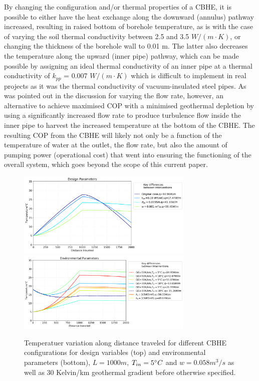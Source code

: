 		By changing the configuration and/or thermal properties of a CBHE, it is possible to either have the heat exchange along the downward (annulus) pathway increased, resulting in raised bottom of borehole temperature, as is with the case of varying the soil thermal conductivity between 2.5 and 3.5 $W/(m \cdot K)$, or changing the thickness of the borehole wall to 0.01 m. The latter also decreases the temperature along the upward (inner pipe) pathway, which can be made possible by assigning an ideal thermal conductivity of an inner pipe at a thermal conductivity of $k_{pp}$ = 0.007 $W/(m \cdot K)$ which is difficult to implement in real projects as it was the thermal conductivity of vacuum-insulated steel pipes. As was pointed out in the discussion for varying the flow rate, however, an alternative to achieve maximised COP with a minimised geothermal depletion by using a significantly increased flow rate to produce turbulence flow inside the inner pipe to harvest the increased temperature at the bottom of the CBHE. The resulting COP from the CBHE will likely not only be a function of the temperature of water at the outlet, the flow rate, but also the amount of pumping power (operational cost) that went into ensuring the functioning of the overall system, which goes beyond the scope of this current paper.
	        \begin{figure}
	            \centering
	            \includegraphics[width=0.75\textwidth]{DesignVars.png}
	            \includegraphics[width=0.75\textwidth]{EnvVars.png}
	            
	            \caption{Temperatuer variation along distance traveled for different CBHE configurations for design variables (top) and environmental parameters (bottom), $L=1000m$, $T_{in}=5\degree C$ and $w=0.058m^3/s$ as well as 30 Kelvin/km geothermal gradient before otherwise specified.}
	            \label{fig:TempCOP}
	        \end{figure}

